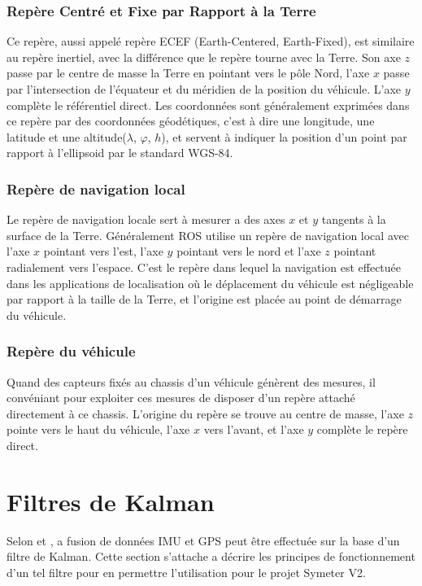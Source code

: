 \documentclass[12pt,a4paper]{report}
\begin{document}
	\subsubsection{Repère Centré et Fixe par Rapport à la Terre}
	Ce repère, aussi appelé repère ECEF (Earth-Centered, Earth-Fixed), est similaire au repère inertiel, avec la différence que le repère tourne avec la Terre. Son axe $z$ passe par le centre de masse la Terre en pointant vers le pôle Nord, l'axe $x$ passe par l'intersection de l'équateur et du méridien de la position du véhicule. L'axe $y$ complète le référentiel direct. Les coordonnées sont généralement exprimées dans ce repère par des coordonnées géodétiques, c'est à dire une longitude, une latitude et une altitude($\lambda$, $\varphi$, $h$), et servent à indiquer la position d'un point par rapport à l'ellipsoid par le standard WGS-84.
	
	\subsubsection{Repère de navigation local}
	Le repère de navigation locale sert à mesurer a des axes $x$ et $y$ tangents à la surface de la Terre. Généralement ROS utilise un repère de navigation local avec l'axe $x$ pointant vers l'est, l'axe $y$ pointant vers le nord et l'axe $z$ pointant radialement vers l'espace. C'est le repère dans lequel la navigation est effectuée dans les applications de localisation où le déplacement du véhicule est négligeable par rapport à la taille de la Terre, et l'origine est placée au point de démarrage du véhicule.
	
	\subsubsection{Repère du véhicule}
	Quand des capteurs fixés au chassis d'un véhicule génèrent des mesures, il convéniant pour exploiter ces mesures de disposer d'un repère attaché directement à ce chassis. L'origine du repère se trouve au centre de masse, l'axe $z$ pointe vers le haut du véhicule, l'axe $x$ vers l'avant, et l'axe $y$ complète le repère direct.
	
	\section{Filtres de Kalman}
	
	Selon \cite{gustavsson_uav_2015} et \cite{menegatti_generalized_2016}, a fusion de données IMU et GPS peut être effectuée sur la base d'un filtre de Kalman. Cette section s'attache a décrire les principes de fonctionnement d'un tel filtre pour en permettre l'utilisation pour le projet Symeter V2.
	
\end{document}
